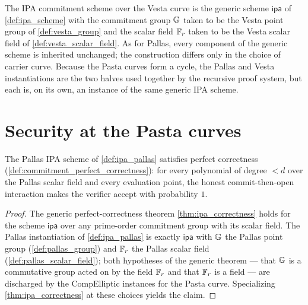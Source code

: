 \begin{definition}
  \label{def:ipa_vesta}
  The IPA commitment scheme over the Vesta curve is the generic scheme
  \(\textsf{ipa}\) of \cref{def:ipa_scheme} with the commitment group \(\mathbb{G}\) taken
  to be the Vesta point group of \cref{def:vesta_group} and the scalar field
  \(\mathbb{F}_r\) taken to be the Vesta scalar field of \cref{def:vesta_scalar_field}. As
  for Pallas, every component of the generic scheme is inherited unchanged; the
  construction differs only in the choice of carrier curve. Because the Pasta
  curves form a cycle, the Pallas and Vesta instantiations are the two halves used
  together by the recursive proof system, but each is, on its own, an instance of
  the same generic IPA scheme.
\end{definition}

\section{Security at the Pasta curves}

\begin{theorem}
  \label{thm:ipa_pallas_correctness}
  The Pallas IPA scheme of \cref{def:ipa_pallas} satisfies perfect correctness
  (\cref{def:commitment_perfect_correctness}): for every polynomial of degree
  \(< d\) over the Pallas scalar field and every evaluation point, the honest
  commit-then-open interaction makes the verifier accept with probability \(1\).
  \begin{proof}
    The generic perfect-correctness theorem \cref{thm:ipa_correctness} holds for
    the scheme \(\textsf{ipa}\) over any prime-order commitment group with its
    scalar field. The Pallas instantiation of \cref{def:ipa_pallas} is exactly
    \(\textsf{ipa}\) with \(\mathbb{G}\) the Pallas point group
    (\cref{def:pallas_group}) and \(\mathbb{F}_r\) the Pallas scalar field
    (\cref{def:pallas_scalar_field}); both hypotheses of the generic theorem —
    that \(\mathbb{G}\) is a commutative group acted on by the field \(\mathbb{F}_r\) and that
    \(\mathbb{F}_r\) is a field — are discharged by the CompElliptic instances for the
    Pasta curve. Specializing \cref{thm:ipa_correctness} at these choices yields
    the claim.
  \end{proof}
\end{theorem}

